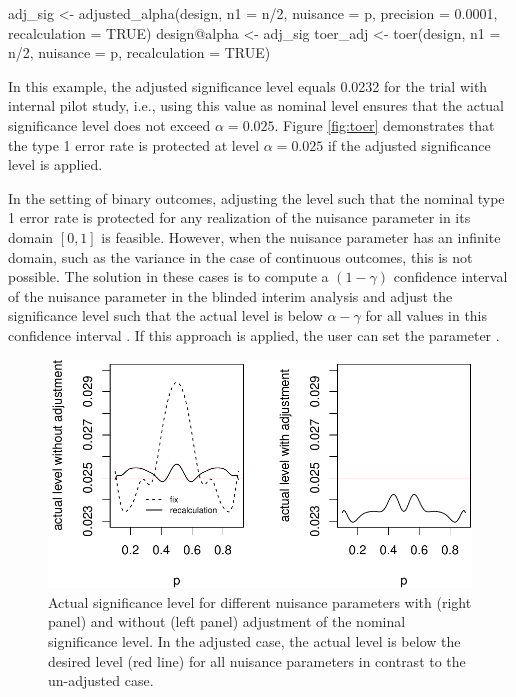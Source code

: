 \begin{example}
adj_sig <- adjusted_alpha(design, n1 = n/2, nuisance = p, precision = 0.0001,
                          recalculation = TRUE)
design@alpha <- adj_sig
toer_adj <- toer(design, n1 = n/2, nuisance = p, recalculation = TRUE)
\end{example}

In this example, the adjusted significance level equals 0.0232 for the
trial with internal pilot study, i.e., using this value as nominal level
ensures that the actual significance level does not exceed
\(\alpha = 0.025\). Figure \ref{fig:toer} demonstrates that the type 1
error rate is protected at level \(\alpha = 0.025\) if the adjusted
significance level is applied.

In the setting of binary outcomes, adjusting the level such that the
nominal type 1 error rate is protected for any realization of the
nuisance parameter in its domain \([0, 1]\) is feasible. However, when
the nuisance parameter has an infinite domain, such as the variance in
the case of continuous outcomes, this is not possible. The solution in
these cases is to compute a \(\left(1 - \gamma\right)\) confidence interval of
the nuisance parameter in the blinded interim analysis and adjust the
significance level such that the actual level is below
\(\alpha - \gamma\) for all values in this confidence interval
\citep{FK2011}. If this approach is applied, the user can set the
parameter .

\begin{figure}
\includegraphics{blindrecalc_paper_files/figure-latex/plot-type-1-error-1} \caption{\label{fig:toer}Actual significance level for different nuisance parameters with (right panel) and without (left panel) adjustment of the nominal significance level. In the adjusted case, the actual level is below the desired level (red line) for all nuisance parameters in contrast to the un-adjusted case.}\label{fig:plot-type-1-error}
\end{figure}

